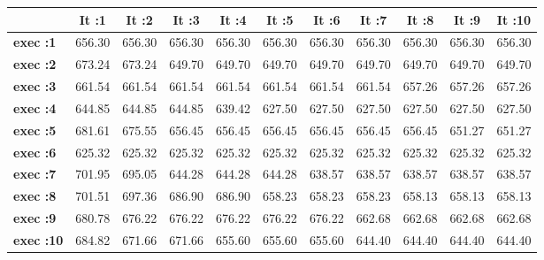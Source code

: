 \begin{tiny}\begin{tabular}{|l|c|c|c|c|c|c|c|c|c|c|}
\hline
&\textbf{It :1}&\textbf{It :2}&\textbf{It :3}&\textbf{It :4}&\textbf{It :5}&\textbf{It :6}&\textbf{It :7}&\textbf{It :8}&\textbf{It :9}&\textbf{It :10}\\\hline
\textbf{exec :1}&656.30&656.30&656.30&656.30&656.30&656.30&656.30&656.30&656.30&656.30\\\hline
\textbf{exec :2}&673.24&673.24&649.70&649.70&649.70&649.70&649.70&649.70&649.70&649.70\\\hline
\textbf{exec :3}&661.54&661.54&661.54&661.54&661.54&661.54&661.54&657.26&657.26&657.26\\\hline
\textbf{exec :4}&644.85&644.85&644.85&639.42&627.50&627.50&627.50&627.50&627.50&627.50\\\hline
\textbf{exec :5}&681.61&675.55&656.45&656.45&656.45&656.45&656.45&656.45&651.27&651.27\\\hline
\textbf{exec :6}&625.32&625.32&625.32&625.32&625.32&625.32&625.32&625.32&625.32&625.32\\\hline
\textbf{exec :7}&701.95&695.05&644.28&644.28&644.28&638.57&638.57&638.57&638.57&638.57\\\hline
\textbf{exec :8}&701.51&697.36&686.90&686.90&658.23&658.23&658.23&658.13&658.13&658.13\\\hline
\textbf{exec :9}&680.78&676.22&676.22&676.22&676.22&676.22&662.68&662.68&662.68&662.68\\\hline
\textbf{exec :10}&684.82&671.66&671.66&655.60&655.60&655.60&644.40&644.40&644.40&644.40\\\hline
\end{tabular}
\end{tiny}